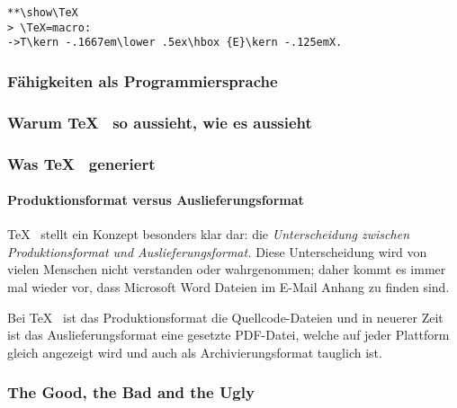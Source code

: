\begin{verbatim}
**\show\TeX
> \TeX=macro:
->T\kern -.1667em\lower .5ex\hbox {E}\kern -.125emX.
\end{verbatim}


\subsubsection{Fähigkeiten als Programmiersprache}


\subsubsection{Warum \TeX~ so aussieht, wie es aussieht}


\subsubsection{Was \TeX~ generiert}


\paragraph{Produktionsformat versus Auslieferungsformat}

\TeX~ stellt ein Konzept besonders klar dar: die \emph{Unterscheidung
zwischen Produktionsformat und Auslieferungsformat.} Diese Unterscheidung
wird von vielen Menschen nicht verstanden oder wahrgenommen; daher kommt
es immer mal wieder vor, dass Microsoft Word Dateien im E-Mail Anhang zu
finden sind.

Bei \TeX~ ist das Produktionsformat die Quellcode-Dateien und in neuerer
Zeit ist das Auslieferungsformat eine gesetzte PDF-Datei, welche auf jeder
Plattform gleich angezeigt wird und auch als Archivierungsformat tauglich
ist.


\subsubsection{The Good, the Bad and the Ugly}
